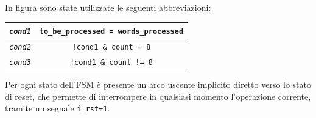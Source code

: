 \documentclass{article}
\begin{document}
In figura sono state utilizzate le seguenti abbreviazioni:
\vspace{-.1cm}
    \def\arraystretch{1.2} %
    \begin{tabular}{||c|c||}
        \hline
        \texttt{\emph{cond1}} & \texttt{to\_be\_processed = words\_processed}                  \\\hline
        \texttt{\emph{cond2}} & \texttt{!cond1 \& count = 8}                                   \\\hline
        \texttt{\emph{cond3}} & \texttt{!cond1 \& count != 8}                                  \\\hline
    \end{tabular}
\vspace{0,2cm}

Per ogni stato dell'FSM è presente un arco uscente implicito diretto verso lo stato di reset, che permette di interrompere in qualsiasi momento l'operazione corrente, tramite un segnale \texttt{i\_rst=1}.
\vspace{0,2cm}


\clearpage
\end{document}
